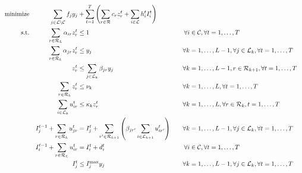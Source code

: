 \documentclass[10pt, a4paper]{article}
\begin{document}
\begin{alignat}{3}
    \text{minimize} &&\sum_{j\in \loc \setminus \cu} f_{j} y_{j} &+\sum_{t=1}^{T} \left( \sum_{r\in \ro} c_r z^t_r + \sum_{i\in \loc} h^t_i I_i^t\right)\label{objfunct}\\ 
    \text{s.t.}  %
    &&\sum_{r\in \ro_L} \alpha_{ir} z^t_r &\leq 1 															&\forall i&\in \cu, \forall t=1,\ldots,T  \label{const:singleroutecustomers}\\
&&\sum_{r\in \ro_k} \alpha_{jr} z^t_r &\leq y_j 															&\forall k&=1,\ldots,L-1, \forall j\in \loc_k, \forall t=1,\ldots,T  \label{const:singleroutedc}\\
&&z^t_r 					&\leq \sum_{j\in\loc_{k}}\beta_{jr}y_j 													&\forall k&=1,\ldots,L-1,r\in \ro_{k+1}, \forall t=1,\ldots,T\label{const:startfromopendepots}\\
    &&\sum_{r\in \ro_k} z^t_r &\leq 	\nu_k													&\forall k&=1,\ldots,L, \forall t=1,\ldots,T  \label{const:fleetcapa}\\
    &&\sum_{i\in \loc_k} u^t_{ir}   		&\leq \kappa_k z^t_r 														&\forall k&=1,\ldots,L, \forall r\in \ro_k, t=1,\ldots,T\label{const:deliveryUB}\\
    &&I^{t-1}_j + \sum_{r\in\ro_k} u^t_{jr}   			&=I^t_j +\sum_{r'\in \ro_{k+1}}\left(\beta_{jr'} \sum_{i\in \loc_{k+1}}u^t_{ir'}\right)\quad 			&\forall k&=1,\ldots,L-1, \forall j\in \loc_k, \forall t=1,\ldots,T \label{const:invflowdepots}\\
    &&I^{t-1}_i+\sum_{r\in \ro_L} u^t_{ir} &= I^t_i +d^t_i 							&\forall i&\in \cu, \forall t=1,\ldots,T\label{const:invflowcustomers}\\
    &&I^t_j					&\leq I_j^{\max} y_j  									&\forall k&=1,\ldots,L-1, \forall j\in \loc_k,\forall t=1,\ldots,T\label{const:invdepotUB}\\	

\end{alignat}
\end{document}

